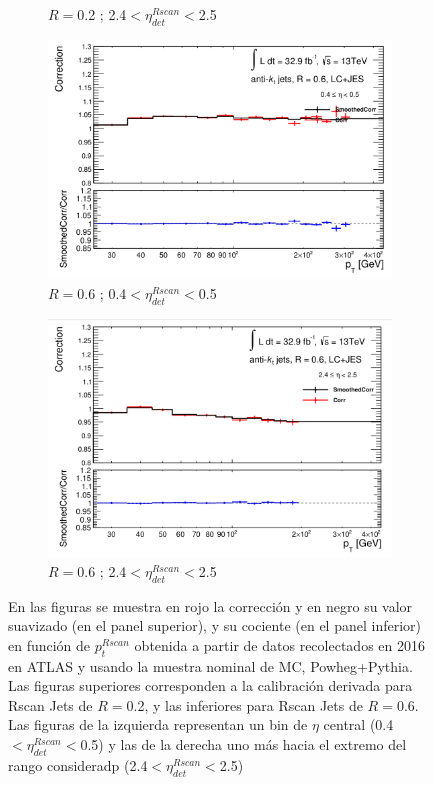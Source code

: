 \begin{figure}[ht]
\begin{subfigure}[b]{0.495\textwidth}
        \caption{$R=$0.2 ; 2.4$<\eta^{Rscan}_{det}<$2.5}
    \end{subfigure}
    \vfill
    \begin{subfigure}[b]{0.495\textwidth}
        \centering
        \includegraphics[width=\textwidth]{images/Smo_6LC_pt_49.png}
        \caption{$R=$0.6 ; 0.4$<\eta^{Rscan}_{det}<$0.5}
    \end{subfigure}
    \hfill
    \begin{subfigure}[b]{0.495\textwidth}
        \centering
        \includegraphics[width=\textwidth]{images/Smo_6LC_pt_69.png}
        \caption{$R=$0.6 ; 2.4$<\eta^{Rscan}_{det}<$2.5}
    \end{subfigure}
    \caption{ En las figuras se muestra en rojo la corrección y en negro su valor suavizado (en el panel superior), y su cociente (en el panel inferior) en función de $p_t^{Rscan}$ obtenida a partir de datos recolectados en 2016 en ATLAS y usando la muestra nominal de MC, Powheg+Pythia. Las figuras superiores corresponden a la calibración derivada para Rscan Jets de $R=$0.2, y las inferiores para Rscan Jets de $R=$0.6. Las figuras de la izquierda representan un bin de $\eta$ central (0.4$<\eta^{Rscan}_{det}<$0.5) y las de la derecha uno más hacia el extremo del rango consideradp (2.4$<\eta^{Rscan}_{det}<$2.5)} 
    \label{fig:Smoothervspt}
\end{figure}

